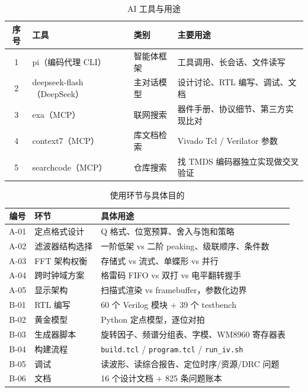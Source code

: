 \documentclass[withoutpreface,bwprint]{cumcmthesis}
\begin{document}
\begin{table}[H]
\centering
\caption{AI 工具与用途}
\label{tab:ai-tool}
\begin{tabular}{cp{3.6cm}p{2.0cm}p{6.0cm}}
\toprule[1.5pt]
\rowcolor{gray!25} 序号 & 工具 & 类别 & 主要用途 \\
\midrule[1pt]
1 & pi（编码代理 CLI）  & 智能体框架 & 工具调用、长会话、文件读写 \\
2 & deepseek-flash（DeepSeek） & 主对话模型 & 设计讨论、RTL 编写、调试、文档 \\
3 & exa（MCP）          & 联网搜索   & 器件手册、协议细节、第三方实现比对 \\
4 & context7（MCP）     & 库文档检索 & Vivado Tcl / Verilator 参数 \\
5 & searchcode（MCP）   & 仓库搜索   & 找 TMDS 编码器独立实现做交叉验证 \\
\bottomrule[1.5pt]
\end{tabular}
\end{table}

\begin{table}[H]
\centering
\caption{使用环节与具体目的}
\label{tab:ai-step}
\begin{tabular}{cp{2.8cm}p{9.0cm}}
\toprule[1.5pt]
\rowcolor{gray!25} 编号 & 环节 & 具体用途 \\
\midrule[1pt]
A-01 & 定点格式设计 & Q 格式、位宽预算、舍入与饱和策略 \\
A-02 & 滤波器结构选择 & 一阶低架 vs 二阶 peaking、级联顺序、条件数 \\
A-03 & FFT 架构权衡 & 存储式 vs 流式、单蝶形 vs 并行 \\
A-04 & 跨时钟域方案 & 格雷码 FIFO vs 双打 vs 电平翻转握手 \\
A-05 & 显示架构 & 扫描式渲染 vs framebuffer，参数化边界 \\
\midrule[0.5pt]
B-01 & RTL 编写 & 60 个 Verilog 模块 + 39 个 testbench \\
B-02 & 黄金模型 & Python 定点模型，逐位对拍 \\
B-03 & 生成器脚本 & 旋转因子、频谱分组表、字模、WM8960 寄存器表 \\
B-04 & 构建流程 & \texttt{build.tcl} / \texttt{program.tcl} / \texttt{run\_iv.sh} \\
B-05 & 调试 & 读波形、读综合报告、定位时序/资源/DRC 问题 \\
B-06 & 文档 & 16 个设计文档 + 825 条问题账本 \\
\bottomrule[1.5pt]
\end{tabular}
\end{table}
\end{document}

